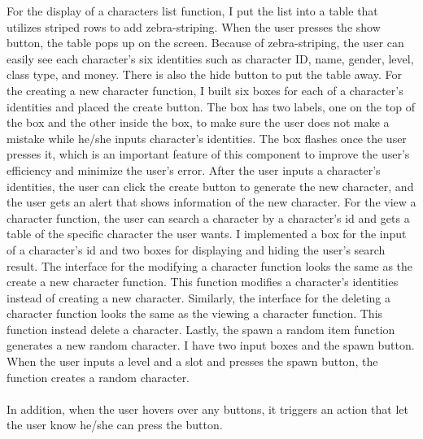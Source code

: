 \documentclass[100pt]{article}
\begin{document}
\large{
For the display of a characters list function, I put the list into a table that utilizes striped rows to add zebra-striping. When the user presses the show button, the table pops up on the screen. Because of zebra-striping, the user can easily see each character's six identities such as character ID, name, gender, level, class type, and money. There is also the hide button to put the table away. For the creating a new character function, I built six boxes for each of a character's identities and placed the create button. The box has two labels, one on the top of the box and the other inside the box, to make sure the user does not make a mistake while he/she inputs character's identities. The box flashes once the user presses it, which is an important feature of this component to improve the user's efficiency and minimize the user's error. After the user inputs a character's identities, the user can click the create button to generate the new character, and the user gets an alert that shows information of the new character. For the view a character function, the user can search a character by a character's id and gets a table of the specific character the user wants. I implemented a box for the input of a character's id and two boxes for displaying and hiding the user's search result. The interface for the modifying a character function looks the same as the create a new character function. This function modifies a character's identities instead of creating a new character. Similarly, the interface for the deleting a character function looks the same as the viewing a character function. This function instead delete a character. Lastly, the spawn a random item function generates a new random character. I have two input boxes and the spawn button. When the user inputs a level and a slot and presses the spawn button, the function creates a random character.
\\\\
In addition, when the user hovers over any buttons, it triggers an action that let the user know he/she can press the button. 

}
\end{document}
